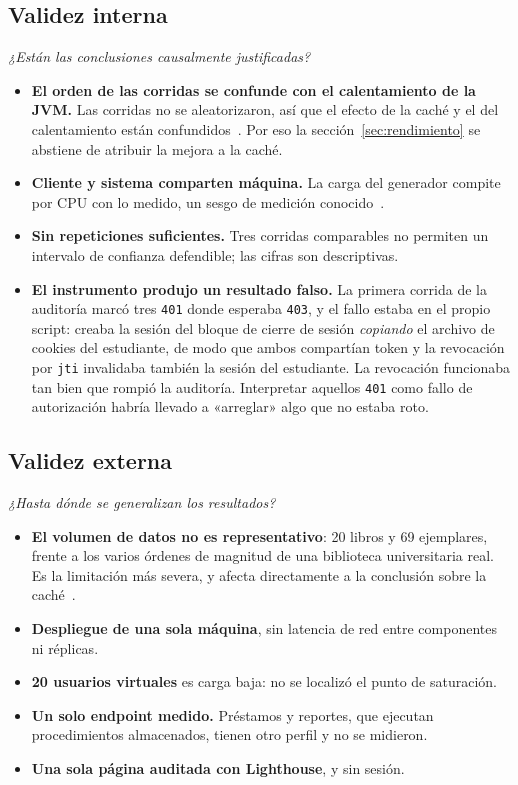 \documentclass[11pt,a4paper]{article}
\begin{document}
\subsection{Validez interna}

\emph{¿Están las conclusiones causalmente justificadas?}

\begin{itemize}[leftmargin=*]
  \item \textbf{El orden de las corridas se confunde con el calentamiento de la
        JVM.} Las corridas no se aleatorizaron, así que el efecto de la caché y el
        del calentamiento están confundidos~\cite{georges2007statistically}. Por
        eso la sección~\ref{sec:rendimiento} se abstiene de atribuir la mejora a la
        caché.
  \item \textbf{Cliente y sistema comparten máquina.} La carga del generador
        compite por CPU con lo medido, un sesgo de medición
        conocido~\cite{mytkowicz2009producing}.
  \item \textbf{Sin repeticiones suficientes.} Tres corridas comparables no
        permiten un intervalo de confianza defendible; las cifras son
        descriptivas.
  \item \textbf{El instrumento produjo un resultado falso.} La primera corrida de
        la auditoría marcó tres \texttt{401} donde esperaba \texttt{403}, y el
        fallo estaba en el propio script: creaba la sesión del bloque de cierre de
        sesión \emph{copiando} el archivo de cookies del estudiante, de modo que
        ambos compartían token y la revocación por \texttt{jti} invalidaba también
        la sesión del estudiante. La revocación funcionaba tan bien que rompió la
        auditoría. Interpretar aquellos \texttt{401} como fallo de autorización
        habría llevado a «arreglar» algo que no estaba roto.
\end{itemize}

\subsection{Validez externa}

\emph{¿Hasta dónde se generalizan los resultados?}

\begin{itemize}[leftmargin=*]
  \item \textbf{El volumen de datos no es representativo}: 20 libros y 69
        ejemplares, frente a los varios órdenes de magnitud de una biblioteca
        universitaria real. Es la limitación más severa, y afecta directamente a
        la conclusión sobre la caché~\cite{kleppmann2017designing}.
  \item \textbf{Despliegue de una sola máquina}, sin latencia de red entre
        componentes ni réplicas.
  \item \textbf{20 usuarios virtuales} es carga baja: no se localizó el punto de
        saturación.
  \item \textbf{Un solo endpoint medido.} Préstamos y reportes, que ejecutan
        procedimientos almacenados, tienen otro perfil y no se midieron.
  \item \textbf{Una sola página auditada con Lighthouse}, y sin sesión.
\end{itemize}
\end{document}
